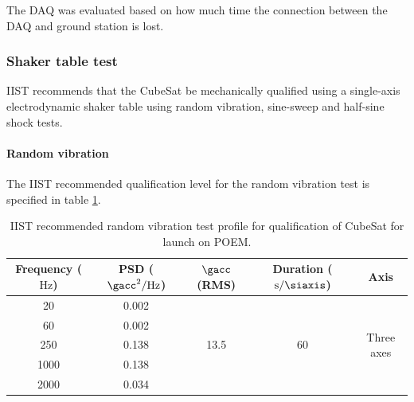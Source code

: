 \documentclass{report}
\begin{document}
The DAQ was evaluated based on how much time the connection between the DAQ and ground station is lost.

\subsubsection{Shaker table test}
\label{sec:shaker-table-test}

IIST recommends that the CubeSat be mechanically qualified using a single-axis electrodynamic shaker table using random vibration, sine-sweep and half-sine shock tests.

\paragraph{Random vibration}

The IIST recommended qualification level for the random vibration test is specified in table \ref{tabl:random-vibration-profile-iist}.

\begin{table}[t]
  \centering
  \begin{tabular}{|c | c | c | c | c|}
    \hline
    \textbf{Frequency ($\si{\hertz}$)} & \textbf{PSD ($\si{\square\gacc\per\hertz}$)} & \textbf{$\si{\gacc}$ (RMS)} & \textbf{Duration ($\si{\second\per\siaxis}$)} & \textbf{Axis}               \\ \hline
    20                                 & 0.002                                        & \multirow{5}{*}{13.5}       & \multirow{5}{*}{60}                           & \multirow{5}{*}{Three axes} \\ \cline{1-2}
    60                                 & 0.002                                        &                             &                                               &                             \\ \cline{1-2}
    250                                & 0.138                                        &                             &                                               &                             \\ \cline{1-2}
    1000                               & 0.138                                        &                             &                                               &                             \\ \cline{1-2}
    2000                               & 0.034                                        &                             &                                               &                             \\ \hline
  \end{tabular}
  \caption{IIST recommended random vibration test profile for qualification of CubeSat for launch on POEM.}
  \label{tabl:random-vibration-profile-iist}
\end{table}
\end{document}
